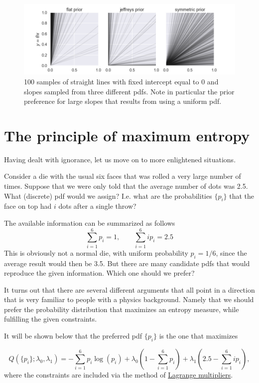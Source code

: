 \documentclass[%
oneside,                 %
final,                   %
10pt]{article}
\begin{document}
\begin{figure}[!ht]  %
  \centerline{\includegraphics[width=0.8\linewidth]{fig/slope_priors.png}}
  \caption{
  100 samples of straight lines with fixed intercept equal to 0 and slopes sampled from three different pdfs. Note in particular the  prior preference for large slopes that results from using a uniform pdf.
  }
\end{figure}



\section{The principle of maximum entropy}

Having dealt with ignorance, let us move on to more enlightened situations.

Consider a die with the usual six faces that was rolled a very large number of times. Suppose that we were only told that the average number of dots was 2.5. What (discrete) pdf would we assign? I.e. what are the probabilities $\{ p_i \}$ that the face on top had $i$ dots after a single throw?

The available information can be summarized as follows
\[
\sum_{i=1}^6 p_i = 1, \qquad \sum_{i=1}^6 i p_i = 2.5
\]
This is obviously not a normal die, with uniform probability $p_i=1/6$, since the average result would then be 3.5. But there are many candidate pdfs that would reproduce the given information. Which one should we prefer?

It turns out that there are several different arguments that all point in a direction that is very familiar to people with a physics background. Namely that we should prefer the probability distribution that maximizes an entropy measure, while fulfilling the given constraints. 

It will be shown below that the preferred pdf $\{ p_i \}$ is the one that maximizes

\[
Q\left( \{ p_i \} ; \lambda_0, \lambda_1 \right)
= -\sum_{i=1}^6 p_i \log(p_i) 
+ \lambda_0 \left( 1 - \sum_{i=1}^6 p_i \right)
+ \lambda_1 \left( 2.5 - \sum_{i=1}^6 i p_i \right),
\]
where the constraints are included via the method of \href{{https://en.wikipedia.org/wiki/Lagrange_multiplier}}{Lagrange multipliers}.
\end{document}
